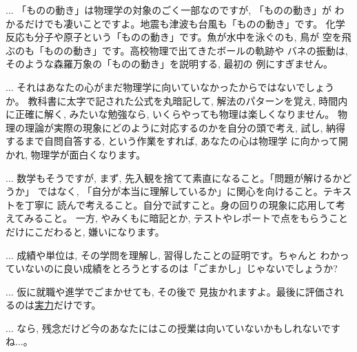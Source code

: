 \begin{faq}{\small{}
 ... 「ものの動き」は物理学の対象のごく一部なのですが, 「ものの動き」が
わかるだけでも凄いことですよ。地震も津波も台風も「ものの動き」です。
化学反応も分子や原子という「ものの動き」です。魚が水中を泳ぐのも, 鳥が
空を飛ぶのも「ものの動き」です。高校物理で出てきたボールの軌跡や
バネの振動は, そのような森羅万象の「ものの動き」を説明する, 最初の
例にすぎません。}\end{faq}

\begin{faq}{\small{}
 ... それはあなたの心がまだ物理学に向いていなかったからではないでしょうか。
教科書に太字で記された公式を丸暗記して, 解法のパターンを覚え, 
時間内に正確に解く, みたいな勉強なら, いくらやっても物理は楽しくなりません。
物理の理論が実際の現象にどのように対応するのかを自分の頭で考え, 
試し, 納得するまで自問自答する, という作業をすれば, あなたの心は物理学
に向かって開かれ, 物理学が面白くなります。}\end{faq}

\begin{faq}{\small{} ... 
数学もそうですが, まず, 先入観を捨てて素直になること。「問題が解けるかどうか」
ではなく, 「自分が本当に理解しているか」に関心を向けること。テキストを丁寧に
読んで考えること。自分で試すこと。身の回りの現象に応用して考えてみること。
一方, やみくもに暗記とか, テストやレポートで点をもらうことだけにこだわると, 
嫌いになります。}\end{faq}

\begin{faq}{\small{} ... 
成績や単位は, その学問を理解し, 習得したことの証明です。ちゃんと
わかっていないのに良い成績をとろうとするのは「ごまかし」じゃないでしょうか?}\end{faq}

\begin{faq}{\small{} ... 仮に就職や進学でごまかせても, その後で
見抜かれますよ。最後に評価されるのは\underline{実力}だけです。}\end{faq}

\begin{faq}{\small{}
 ... なら, 残念だけど今のあなたにはこの授業は向いていないかもしれないですね...。}\end{faq}

